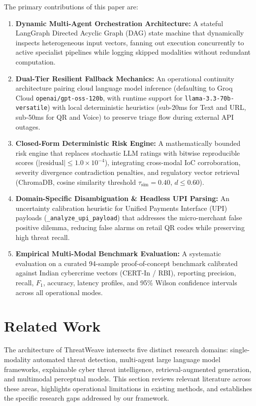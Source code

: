 \documentclass[conference]{IEEEtran}
\begin{document}
The primary contributions of this paper are:
\begin{enumerate}
    \item \textbf{Dynamic Multi-Agent Orchestration Architecture:} A stateful LangGraph Directed Acyclic Graph (DAG) state machine that dynamically inspects heterogeneous input vectors, fanning out execution concurrently to active specialist pipelines while logging skipped modalities without redundant computation.
    \item \textbf{Dual-Tier Resilient Fallback Mechanics:} An operational continuity architecture pairing cloud language model inference (defaulting to Groq Cloud \texttt{openai/gpt-oss-120b}, with runtime support for \texttt{llama-3.3-70b-versatile}) with local deterministic heuristics (sub-20ms for Text and URL, sub-50ms for QR and Voice) to preserve triage flow during external API outages.
    \item \textbf{Closed-Form Deterministic Risk Engine:} A mathematically bounded risk engine that replaces stochastic LLM ratings with bitwise reproducible scores ($|\text{residual}| \le 1.0 \times 10^{-4}$), integrating cross-modal IoC corroboration, severity divergence contradiction penalties, and regulatory vector retrieval (ChromaDB, cosine similarity threshold $\tau_{\text{sim}} = 0.40$, $d \le 0.60$).
    \item \textbf{Domain-Specific Disambiguation \& Headless UPI Parsing:} An uncertainty calibration heuristic for Unified Payments Interface (UPI) payloads (\texttt{\_analyze\_upi\_payload}) that addresses the micro-merchant false positive dilemma, reducing false alarms on retail QR codes while preserving high threat recall.
    \item \textbf{Empirical Multi-Modal Benchmark Evaluation:} A systematic evaluation on a curated 94-sample proof-of-concept benchmark calibrated against Indian cybercrime vectors (CERT-In / RBI), reporting precision, recall, $F_1$, accuracy, latency profiles, and 95\% Wilson confidence intervals across all operational modes.
\end{enumerate}

\section{Related Work}
The architecture of ThreatWeave intersects five distinct research domains: single-modality automated threat detection, multi-agent large language model frameworks, explainable cyber threat intelligence, retrieval-augmented generation, and multimodal perceptual models. This section reviews relevant literature across these areas, highlights operational limitations in existing methods, and establishes the specific research gaps addressed by our framework.
\end{document}

